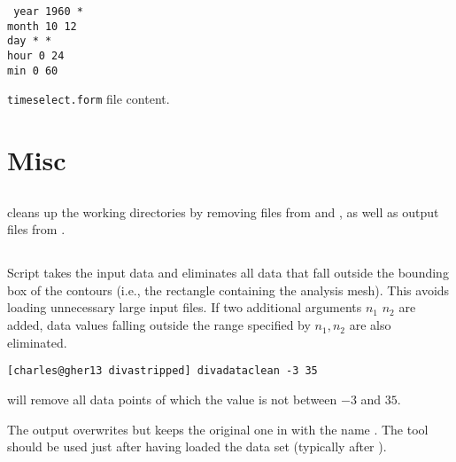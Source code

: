\begin{exfile}[H]
\begin{footnotesize}
\texttt{
year 1960 *\\
month 10 12\\
day * *\\
hour 0 24\\
min 0 60
}
\end{footnotesize}
\caption{{\tt timeselect.form} file content.} 
\end{exfile}






\section{Misc}

\subsection{}

 cleans up the working directories by removing  files from  and , as well as output files from .

\subsection{}

Script  takes the input data  and eliminates all data that fall outside the bounding box of the contours (i.e., the rectangle containing the analysis mesh). This avoids loading unnecessary large input files. If two additional arguments $n_{1}$ $n_{2}$ are added, data values falling outside the range specified by $n_{1},n_{2}$ are also eliminated.

\example
\begin{lstlisting}[style=Bash]
[charles@gher13 divastripped] divadataclean -3 35
\end{lstlisting}
will remove all data points of which the value is not between $-3$ and $35$.

The output overwrites  but keeps the original one in  with the name . The tool should be used just after having loaded the data set (typically after ).

